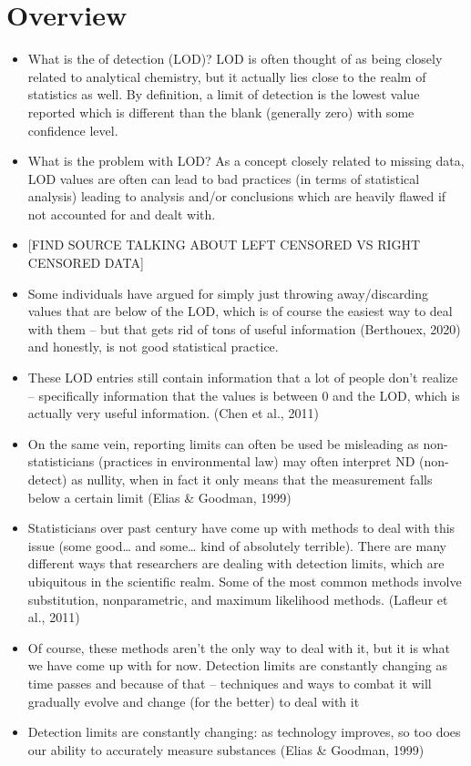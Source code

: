 \documentclass[12pt, twoside]{amherstthesis}
\begin{document}
\hypertarget{overview}{%
\section{Overview}\label{overview}}
\begin{itemize}
\item
  What is the of detection (LOD)? LOD is often thought of as being closely related to analytical chemistry, but it actually lies close to the realm of statistics as well. By definition, a limit of detection is the lowest value reported which is different than the blank (generally zero) with some confidence level.
\item
  What is the problem with LOD? As a concept closely related to missing data, LOD values are often can lead to bad practices (in terms of statistical analysis) leading to analysis and/or conclusions which are heavily flawed if not accounted for and dealt with.
\item
  {[}FIND SOURCE TALKING ABOUT LEFT CENSORED VS RIGHT CENSORED DATA{]}
\item
  Some individuals have argued for simply just throwing away/discarding values that are below of the LOD, which is of course the easiest way to deal with them -- but that gets rid of tons of useful information (Berthouex, 2020) and honestly, is not good statistical practice.
\item
  These LOD entries still contain information that a lot of people don't realize -- specifically information that the values is between 0 and the LOD, which is actually very useful information. (Chen et al., 2011)
\item
  On the same vein, reporting limits can often be used be misleading as non-statisticians (practices in environmental law) may often interpret ND (non-detect) as nullity, when in fact it only means that the measurement falls below a certain limit (Elias \& Goodman, 1999)
\item
  Statisticians over past century have come up with methods to deal with this issue (some good\ldots{} and some\ldots{} kind of absolutely terrible). There are many different ways that researchers are dealing with detection limits, which are ubiquitous in the scientific realm. Some of the most common methods involve substitution, nonparametric, and maximum likelihood methods. (Lafleur et al., 2011)
\item
  Of course, these methods aren't the only way to deal with it, but it is what we have come up with for now. Detection limits are constantly changing as time passes and because of that -- techniques and ways to combat it will gradually evolve and change (for the better) to deal with it
\item
  Detection limits are constantly changing: as technology improves, so too does our ability to accurately measure substances (Elias \& Goodman, 1999)
\end{itemize}
\end{document}
